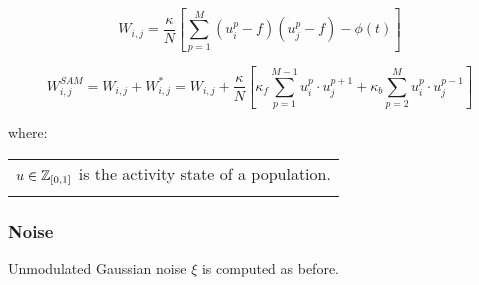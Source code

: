         \begin{equation}
            W_{i,j} = \frac{\kappa}{N} \left[\sum_{p=1}^{M} (u_{i}^{p} - f) (u_{j}^{p} - f) - \phi(t) \right]
        \label{eq:population_weights} \end{equation}

        \begin{equation}
            W_{i, j}^{SAM} = W_{i, j} + W_{i, j}^{*} = W_{i,j} + \frac{\kappa}{N} \left[ \kappa_{f} \sum_{p=1}^{M-1} u_{i}^{p} \cdot u_{j}^{p + 1} + \kappa_{b} \sum_{p=2}^{M} u_{i}^{p} \cdot u_{j}^{p - 1} \right]
        \label{eq:population_weights_sam} \end{equation}

        where:

        \begin{tabular}{l} \\
            \(u \in \mathbb{Z}_{[0, 1]}\) is the activity state of a population. \\
        \label{tab:conditions_population_weights} \end{tabular} \bigskip

\subsubsection{Noise}

    Unmodulated Gaussian noise \(\xi\) is computed as before.
% 
% 
% 
% 


%
%
%


